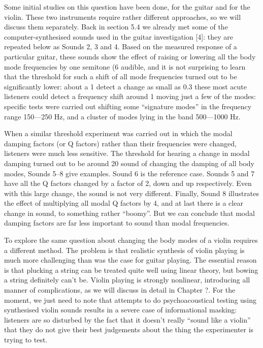   Some initial studies on this question have been done, for the guitar and for 
  the violin. These two instruments require rather different approaches, so we 
  will discuss them separately. Back in section 5.4 we already met some of the 
  computer-synthesised sounds used in the guitar investigation [4]: they are 
  repeated below as Sounds 2, 3 and 4. Based on the measured response of a 
  particular guitar, these sounds show the effect of raising or lowering all 
  the body mode frequencies by one semitone (6%
  audible, and it is not surprising to learn that the threshold for such a 
  shift of all mode frequencies turned out to be significantly lower: about a 
  1%
  detect a change as small as 0.3%
  these most acute listeners could detect a frequency shift around 1%
  moving just a few of the modes: specific tests were carried out shifting some 
  “signature modes” in the frequency range 150—250 Hz, and a cluster of modes 
  lying in the band 500—1000 Hz. 

  When a similar threshold experiment was carried out in which the modal 
  damping factors (or Q factors) rather than their frequencies were changed, 
  listeners were much less sensitive. The threshold for hearing a change in 
  modal damping turned out to be around 20%
  sound of changing the damping of all body modes, Sounds 5--8 give examples. 
  Sound 6 is the reference case. Sounds 5 and 7 have all the Q factors changed 
  by a factor of 2, down and up respectively. Even with this large change, the 
  sound is not very different. Finally, Sound 8 illustrates the effect of 
  multiplying all modal Q factors by 4, and at last there is a clear change in 
  sound, to something rather ``boomy''. But we can conclude that modal damping 
  factors are far less important to sound than modal frequencies. 

  To explore the same question about changing the body modes of a violin 
  requires a different method. The problem is that realistic synthesis of 
  violin playing is much more challenging than was the case for guitar playing. 
  The essential reason is that plucking a string can be treated quite well 
  using linear theory, but bowing a string definitely can’t be. Violin playing 
  is strongly nonlinear, introducing all manner of complications, as we will 
  discuss in detail in Chapter ?. For the moment, we just need to note that 
  attempts to do psychoacoustical testing using synthesised violin sounds 
  results in a severe case of informational masking: listeners are so disturbed 
  by the fact that it doesn’t really “sound like a violin” that they do not 
  give their best judgements about the thing the experimenter is trying to 
  test. 

